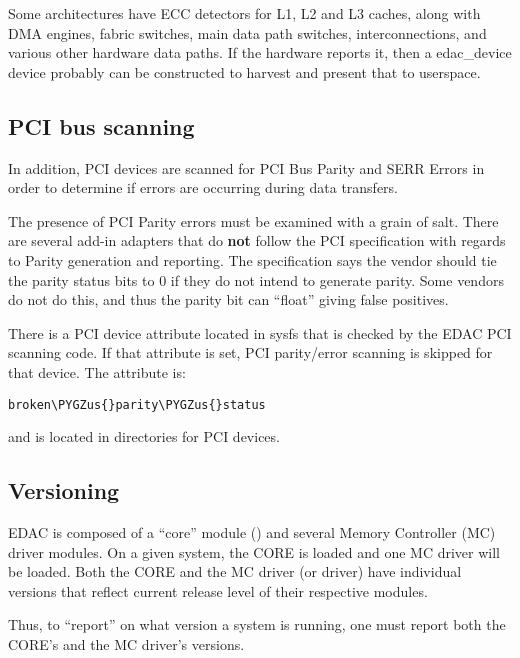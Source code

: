 \documentclass[a4paper,8pt,english]{sphinxmanual}
\def\PYGZus{\char`\_}
\begin{document}
Some architectures have ECC detectors for L1, L2 and L3 caches,
along with DMA engines, fabric switches, main data path switches,
interconnections, and various other hardware data paths. If the hardware
reports it, then a edac\_device device probably can be constructed to
harvest and present that to userspace.


\subsection{PCI bus scanning}
\label{admin-guide/ras:pci-bus-scanning}
In addition, PCI devices are scanned for PCI Bus Parity and SERR Errors
in order to determine if errors are occurring during data transfers.

The presence of PCI Parity errors must be examined with a grain of salt.
There are several add-in adapters that do \textbf{not} follow the PCI specification
with regards to Parity generation and reporting. The specification says
the vendor should tie the parity status bits to 0 if they do not intend
to generate parity.  Some vendors do not do this, and thus the parity bit
can ``float'' giving false positives.

There is a PCI device attribute located in sysfs that is checked by
the EDAC PCI scanning code. If that attribute is set, PCI parity/error
scanning is skipped for that device. The attribute is:

\begin{Verbatim}[commandchars=\\\{\}]
broken\PYGZus{}parity\PYGZus{}status
\end{Verbatim}

and is located in  directories for
PCI devices.


\subsection{Versioning}
\label{admin-guide/ras:versioning}
EDAC is composed of a ``core'' module () and several Memory
Controller (MC) driver modules. On a given system, the CORE is loaded
and one MC driver will be loaded. Both the CORE and the MC driver (or
 driver) have individual versions that reflect current
release level of their respective modules.

Thus, to ``report'' on what version a system is running, one must report
both the CORE's and the MC driver's versions.
\end{document}
